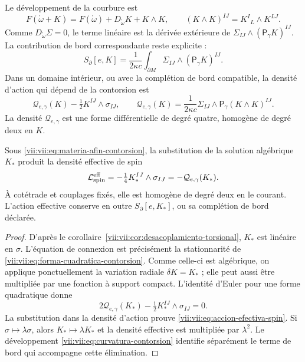 Le développement de la courbure est
\begin{equation}
 F(\mathring\omega+K)
 =F(\mathring\omega)+D_{\mathring\omega}K+K\wedge K,
 \qquad (K\wedge K)^{IJ}=K^I{}_{L}\wedge K^{LJ}.
 \label{vii:vii:eq:curvatura-contorsion}
\end{equation}
Comme \(D_{\mathring\omega}\Sigma=0\), le terme linéaire est la
dérivée extérieure de \(\Sigma_{IJ}\wedge(\mathsf P_\gamma K)^{IJ}\).
La contribution de bord correspondante reste explicite :
\begin{equation}
 S_\partial[e,K]=\frac1{2\kappa c}
     \int_{\partial M}\Sigma_{IJ}\wedge(\mathsf P_\gamma K)^{IJ}.
 \label{vii:vii:eq:borde-contorsion}
\end{equation}
Dans un domaine intérieur, ou avec la complétion de bord compatible,
la densité d'action qui dépend de la contorsion est
\begin{equation}
 \mathcal Q_{e,\gamma}(K)-\tfrac12K^{IJ}\wedge\sigma_{IJ},
 \qquad
 \mathcal Q_{e,\gamma}(K)
  =\frac1{2\kappa c}\Sigma_{IJ}\wedge
                         \mathsf P_\gamma(K\wedge K)^{IJ}.
 \label{vii:vii:eq:forma-cuadratica-contorsion}
\end{equation}
La densité \(\mathcal Q_{e,\gamma}\) est une forme différentielle de
degré quatre, homogène de degré deux en \(K\).

\begin{theorem}
\label{vii:vii:thm:respuesta-cuadratica}
Sous \eqref{vii:vii:eq:materia-afin-contorsion}, la substitution de la
solution algébrique \(K_*\) produit la densité effective de spin
\begin{equation}
 \mathcal L_{\rm spin}^{\rm eff}
 =-\tfrac14 K_*^{IJ}\wedge\sigma_{IJ}
 =-\mathcal Q_{e,\gamma}(K_*).
 \label{vii:vii:eq:accion-efectiva-spin}
\end{equation}
À cotétrade et couplages fixés, elle est homogène de degré deux en
le courant. L'action effective conserve en outre
\(S_\partial[e,K_*]\), ou sa complétion de bord déclarée.
\end{theorem}
\begin{proof}
D'après le corollaire~\ref{vii:vii:cor:desacoplamiento-torsional},
\(K_*\) est linéaire en \(\sigma\). L'équation de connexion est
précisément la stationnarité de
\eqref{vii:vii:eq:forma-cuadratica-contorsion}. Comme celle-ci est algébrique,
on applique ponctuellement la variation radiale \(\delta K=K_*\) ;
elle peut aussi être multipliée par une fonction à support compact.
L'identité d'Euler pour une forme quadratique donne
\[
 2\mathcal Q_{e,\gamma}(K_*)
             -\tfrac12K_*^{IJ}\wedge\sigma_{IJ}=0.
\]
La substitution dans la densité d'action prouve \eqref{vii:vii:eq:accion-efectiva-spin}. Si \(\sigma\mapsto\lambda\sigma\), alors \(K_*\mapsto\lambda K_*\) et la densité effective est multipliée par \(\lambda^2\). Le développement \eqref{vii:vii:eq:curvatura-contorsion} identifie séparément le terme de bord qui accompagne cette élimination.
\end{proof}

